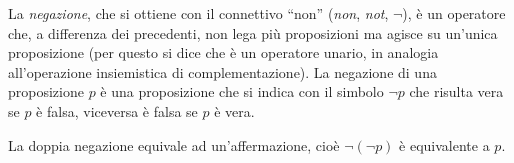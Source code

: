 La \emph{negazione}, che si ottiene con il connettivo ``non'' (\emph{non}, \emph{not}, $\neg$), è un operatore che, a differenza dei precedenti, non lega più proposizioni ma agisce su un'unica proposizione (per questo si dice che è un operatore unario, in analogia all'operazione insiemistica di complementazione). La negazione di una proposizione $p$ è una proposizione che si indica con il simbolo $\neg p$ che risulta vera se $p$ è falsa, viceversa è falsa se $p$ è vera.

La doppia negazione equivale ad un'affermazione, cioè $\neg(\neg p)$ è equivalente a $p$.

